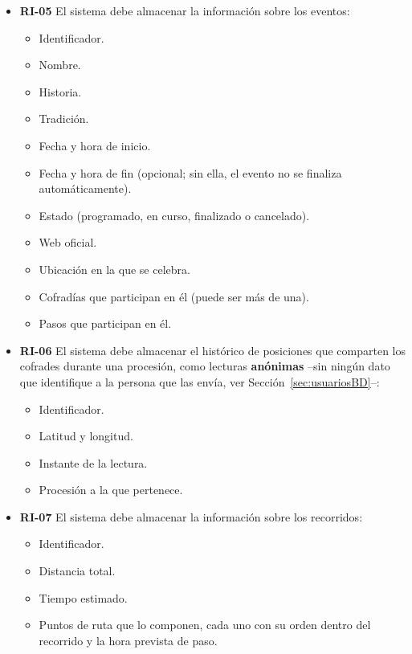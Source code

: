 \begin{itemize}
    \item \textbf{RI-05}  El sistema debe almacenar la información sobre los eventos:
    \begin{itemize}
        \item Identificador.
        \item Nombre.
        \item Historia.
        \item Tradición.
        \item Fecha y hora de inicio.
        \item Fecha y hora de fin (opcional; sin ella, el evento no se finaliza automáticamente).
        \item Estado (programado, en curso, finalizado o cancelado).
        \item Web oficial.
        \item Ubicación en la que se celebra.
        \item Cofradías que participan en él (puede ser más de una).
        \item Pasos que participan en él.
    \end{itemize}

    \item \textbf{RI-06}  El sistema debe almacenar el histórico de posiciones que comparten los cofrades durante una procesión, como lecturas \textbf{anónimas} --sin ningún dato que identifique a la persona que las envía, ver Sección~\ref{sec:usuariosBD}--:
    \begin{itemize}
        \item Identificador.
        \item Latitud y longitud.
        \item Instante de la lectura.
        \item Procesión a la que pertenece.
    \end{itemize}

    \item \textbf{RI-07}  El sistema debe almacenar la información sobre los recorridos:
    \begin{itemize}
        \item Identificador.
        \item Distancia total.
        \item Tiempo estimado.
        \item Puntos de ruta que lo componen, cada uno con su orden dentro del recorrido y la hora prevista de paso.
    \end{itemize}


\end{itemize}
